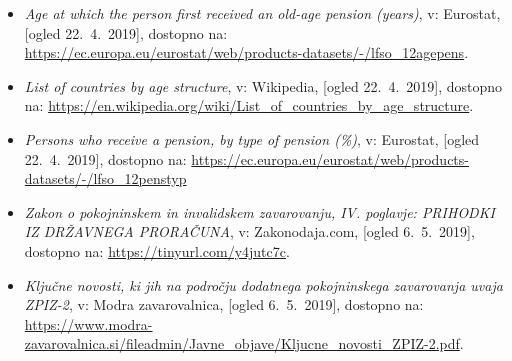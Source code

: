 \documentclass[10pt]{beamer}
\begin{document}
\begin{frame}
\begin{itemize}
\item
\label{Eurostat pokojnine}
\emph{Age at which the person first received an old-age pension (years)}, v: Eurostat, [ogled 22.~4.~2019], dostopno na: \url{https://ec.europa.eu/eurostat/web/products-datasets/-/lfso_12agepens}.

\item
\label{Struktura prebivalstva}
\emph{List of countries by age structure}, v: Wikipedia, [ogled 22.~4.~2019], dostopno na: \url{https://en.wikipedia.org/wiki/List_of_countries_by_age_structure}.

\item
\label{Eurostat pokojnine procentualno}
\emph{Persons who receive a pension, by type of pension (\%)}, v: Eurostat, [ogled 22.~4.~2019], dostopno na: \url{https://ec.europa.eu/eurostat/web/products-datasets/-/lfso_12penstyp}

\item
\label{ZPIZ2}
\emph{Zakon o pokojninskem in invalidskem zavarovanju, IV. poglavje: PRIHODKI IZ DRŽAVNEGA PRORAČUNA}, v: Zakonodaja.com, [ogled 6.~5.~2019], dostopno na: \url{https://tinyurl.com/y4jutc7c}.

\item
\label{Novosti ZIPZ2}
\emph{Ključne novosti, ki jih na področju dodatnega pokojninskega zavarovanja uvaja ZPIZ-2}, v: Modra zavarovalnica, [ogled 6.~5.~2019], dostopno na: \url{https://www.modra-zavarovalnica.si/fileadmin/Javne_objave/Kljucne_novosti_ZPIZ-2.pdf}.
\end{itemize}
\end{frame}
\end{document}
